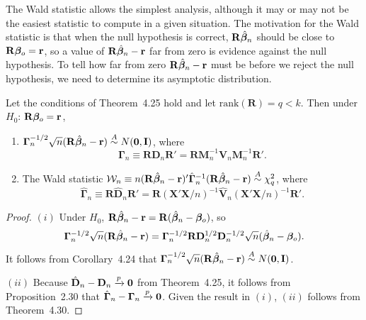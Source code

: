 The Wald statistic allows the simplest analysis, although it may or may
not be the easiest statistic to compute in a given situation. The motivation
for the Wald statistic is that when the null hypothesis is correct, $\mathbf{R}\hat{\boldsymbol{\beta}}_n$
should be close to $\mathbf{R}\boldsymbol{\beta}_o = \mathbf{r}$, so a value of $\mathbf{R}\hat{\boldsymbol{\beta}}_n - \mathbf{r}$ far from zero is evidence
against the null hypothesis. To tell how far from zero $\mathbf{R}\hat{\boldsymbol{\beta}}_n - \mathbf{r}$ must be
before we reject the null hypothesis, we need to determine its asymptotic
distribution.

\begin{theorem}\label{thm:4.31}
Let the conditions of Theorem~4.25 hold and let $\mathrm{rank}(\mathbf{R}) = q < k$. Then under $H_0$: $\mathbf{R}\boldsymbol{\beta}_o = \mathbf{r}$,
\begin{enumerate}[label=(\roman*)]
\item $\boldsymbol{\Gamma}_n^{-1/2}\sqrt{n}(\mathbf{R}\hat{\boldsymbol{\beta}}_n - \mathbf{r}) \overset{A}{\sim} N(\mathbf{0}, \mathbf{I})$, where
\[
\boldsymbol{\Gamma}_n \equiv \mathbf{R}\mathbf{D}_n\mathbf{R}' = \mathbf{R}\mathbf{M}_n^{-1}\mathbf{V}_n\mathbf{M}_n^{-1}\mathbf{R}'.
\]

\item The Wald statistic $\mathcal{W}_n \equiv n(\mathbf{R}\hat{\boldsymbol{\beta}}_n - \mathbf{r})'\hat{\boldsymbol{\Gamma}}_n^{-1}(\mathbf{R}\hat{\boldsymbol{\beta}}_n - \mathbf{r}) \overset{A}{\sim} \chi_q^2$, where
\[
\hat{\boldsymbol{\Gamma}}_n \equiv \mathbf{R}\hat{\mathbf{D}}_n\mathbf{R}' = \mathbf{R}(\mathbf{X}'\mathbf{X}/n)^{-1}\hat{\mathbf{V}}_n(\mathbf{X}'\mathbf{X}/n)^{-1}\mathbf{R}'.
\]
\end{enumerate}
\end{theorem}

\begin{proof}
$(i)$ Under $H_0$, $\mathbf{R}\hat{\boldsymbol{\beta}}_n - \mathbf{r} = \mathbf{R}(\hat{\boldsymbol{\beta}}_n - \boldsymbol{\beta}_o)$, so
\[
\boldsymbol{\Gamma}_n^{-1/2}\sqrt{n}(\mathbf{R}\hat{\boldsymbol{\beta}}_n - \mathbf{r}) = \boldsymbol{\Gamma}_n^{-1/2}\mathbf{R}\mathbf{D}_n^{1/2}\mathbf{D}_n^{-1/2}\sqrt{n}(\hat{\boldsymbol{\beta}}_n - \boldsymbol{\beta}_o).
\]
It follows from Corollary~4.24 that $\boldsymbol{\Gamma}_n^{-1/2}\sqrt{n}(\mathbf{R}\hat{\boldsymbol{\beta}}_n - \mathbf{r}) \overset{A}{\sim} N(\mathbf{0}, \mathbf{I})$.

$(ii)$ Because $\hat{\mathbf{D}}_n - \mathbf{D}_n \xrightarrow{p} \mathbf{0}$ from Theorem~4.25, it follows from Proposition~2.30 that $\hat{\boldsymbol{\Gamma}}_n - \boldsymbol{\Gamma}_n \xrightarrow{p} \mathbf{0}$. Given the result in $(i)$, $(ii)$ follows from
Theorem~4.30.
\end{proof}

